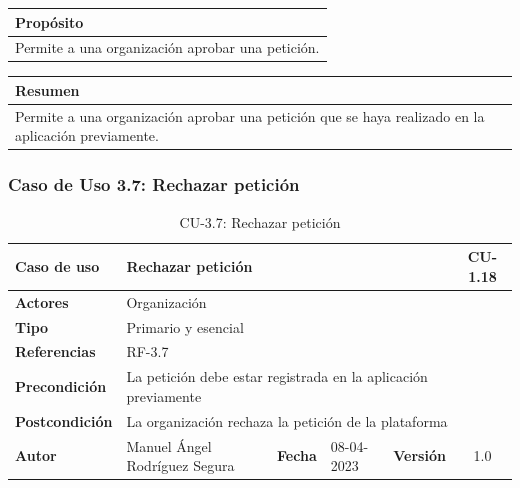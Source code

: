 \begin{table}[H]
    \centering
    \begin{tabularx}{\textwidth}{@{} |L |@{}} \hline
        \textbf{Propósito} \\
        \hline
        Permite a una organización aprobar una petición. \\
        \hline
    \end{tabularx}
\end{table}

\begin{table}[H]
    \centering
    \begin{tabularx}{\textwidth}{@{} |L |@{}} \hline
        \textbf{Resumen} \\
        \hline
        Permite a una organización aprobar una petición que se haya realizado en la aplicación previamente. \\
        \hline
    \end{tabularx}
\end{table}

\subsubsection{Caso de Uso 3.7: Rechazar petición}\label{subsubsec:rechazar-peticion}

\begin{table}[H]
    \begin{center}
        \begin{adjustbox}{width=\textwidth}
            \begin{tabular}{ | l | l | l | l | c | c | }
                \hline
                \textbf{Caso de uso} & \multicolumn{4}{l|}{Rechazar petición} & \cellcolor{gray!50} \textbf{CU-1.18}\\
                \hline
                \textbf{Actores} & \multicolumn{5}{p{0.5\linewidth}|}{Organización} \\
                \hline
                \textbf{Tipo} & \multicolumn{5}{l|}{Primario y esencial} \\
                \hline
                \textbf{Referencias} & \multicolumn{3}{l|}{RF-3.7} & \multicolumn{2}{l|}{ }\\
                \hline
                \textbf{Precondición} & \multicolumn{5}{l|}{La petición debe estar registrada en la aplicación previamente} \\
                \hline
                \textbf{Postcondición} & \multicolumn{5}{l|}{La organización rechaza la petición de la plataforma} \\
                \hline
                \textbf{Autor} & \multicolumn{1}{p{0.25\linewidth}|}{Manuel Ángel Rodríguez Segura} & \textbf{Fecha} &
                08-04-2023     & \textbf{Versión}                                                      & 1.0\\
                \hline
            \end{tabular}
        \end{adjustbox}
        \caption{CU-3.7: Rechazar petición}
        \label{tab:rechazar-peticion}
    \end{center}
\end{table}

